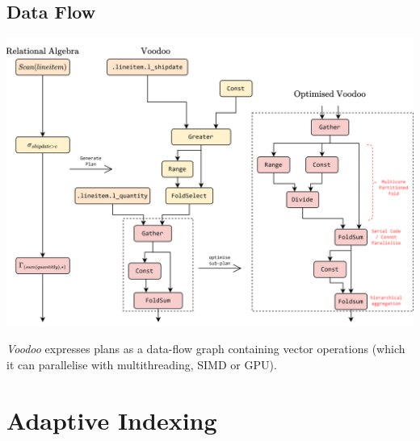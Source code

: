 \subsection{Data Flow}
\begin{center}
    \includegraphics[width=\textwidth]{advanced_topics/images/voodoo.drawio.png}
\end{center}
\textit{Voodoo} expresses plans as a data-flow graph containing vector operations (which it can parallelise with multithreading, SIMD or GPU).

\section{Adaptive Indexing}
